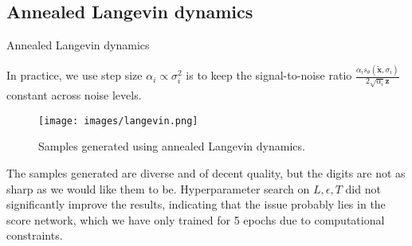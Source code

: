 \documentclass{article}
\begin{document}
\subsection{Annealed Langevin dynamics} \label{subsec:langevin}
\begin{algorithm}[H]
	\caption{Annealed Langevin dynamics}
	\label{alg:anneal}
	\begin{algorithmic}[1]
	         
            \EndFor
        \EndFor
        \item[]
	\end{algorithmic}
\end{algorithm}
In practice, we use step size $\alpha_i \propto \sigma_i^2$ is to keep the signal-to-noise ratio $\frac{ \alpha_i s_\theta(\tilde {\mathbf{x}}, \sigma_i)}{2\sqrt{\alpha_i}\mathbf{z}}$ constant across noise levels.

\begin{figure}[H]
    \centering
    \texttt{[image: images/langevin.png]}
    \caption{Samples generated using annealed Langevin dynamics.}
    \label{fig:langevin}
\end{figure}
The samples generated are diverse and of decent quality, but the digits are not as sharp as we would like them to be.
Hyperparameter search on $L, \epsilon, T$ did not significantly improve the results, indicating that the issue probably lies in the score network,
which we have only trained for 5 epochs due to computational constraints.
\end{document}
